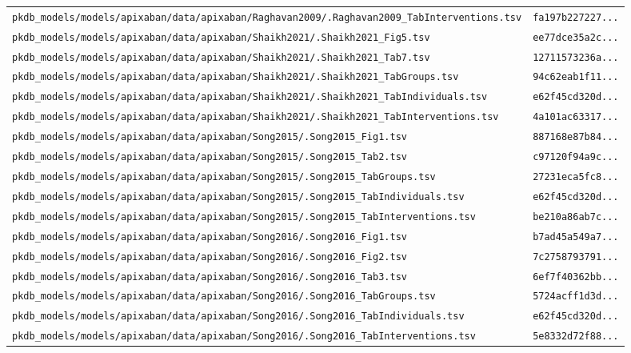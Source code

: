 \begin{longtable}{ll}
\texttt{pkdb\_models/models/apixaban/data/apixaban/Raghavan2009/.Raghavan2009\_TabInterventions.tsv} & \texttt{fa197b227227...} \\
\texttt{pkdb\_models/models/apixaban/data/apixaban/Shaikh2021/.Shaikh2021\_Fig5.tsv} & \texttt{ee77dce35a2c...} \\
\texttt{pkdb\_models/models/apixaban/data/apixaban/Shaikh2021/.Shaikh2021\_Tab7.tsv} & \texttt{12711573236a...} \\
\texttt{pkdb\_models/models/apixaban/data/apixaban/Shaikh2021/.Shaikh2021\_TabGroups.tsv} & \texttt{94c62eab1f11...} \\
\texttt{pkdb\_models/models/apixaban/data/apixaban/Shaikh2021/.Shaikh2021\_TabIndividuals.tsv} & \texttt{e62f45cd320d...} \\
\texttt{pkdb\_models/models/apixaban/data/apixaban/Shaikh2021/.Shaikh2021\_TabInterventions.tsv} & \texttt{4a101ac63317...} \\
\texttt{pkdb\_models/models/apixaban/data/apixaban/Song2015/.Song2015\_Fig1.tsv} & \texttt{887168e87b84...} \\
\texttt{pkdb\_models/models/apixaban/data/apixaban/Song2015/.Song2015\_Tab2.tsv} & \texttt{c97120f94a9c...} \\
\texttt{pkdb\_models/models/apixaban/data/apixaban/Song2015/.Song2015\_TabGroups.tsv} & \texttt{27231eca5fc8...} \\
\texttt{pkdb\_models/models/apixaban/data/apixaban/Song2015/.Song2015\_TabIndividuals.tsv} & \texttt{e62f45cd320d...} \\
\texttt{pkdb\_models/models/apixaban/data/apixaban/Song2015/.Song2015\_TabInterventions.tsv} & \texttt{be210a86ab7c...} \\
\texttt{pkdb\_models/models/apixaban/data/apixaban/Song2016/.Song2016\_Fig1.tsv} & \texttt{b7ad45a549a7...} \\
\texttt{pkdb\_models/models/apixaban/data/apixaban/Song2016/.Song2016\_Fig2.tsv} & \texttt{7c2758793791...} \\
\texttt{pkdb\_models/models/apixaban/data/apixaban/Song2016/.Song2016\_Tab3.tsv} & \texttt{6ef7f40362bb...} \\
\texttt{pkdb\_models/models/apixaban/data/apixaban/Song2016/.Song2016\_TabGroups.tsv} & \texttt{5724acff1d3d...} \\
\texttt{pkdb\_models/models/apixaban/data/apixaban/Song2016/.Song2016\_TabIndividuals.tsv} & \texttt{e62f45cd320d...} \\
\texttt{pkdb\_models/models/apixaban/data/apixaban/Song2016/.Song2016\_TabInterventions.tsv} & \texttt{5e8332d72f88...} \\

\end{longtable}

